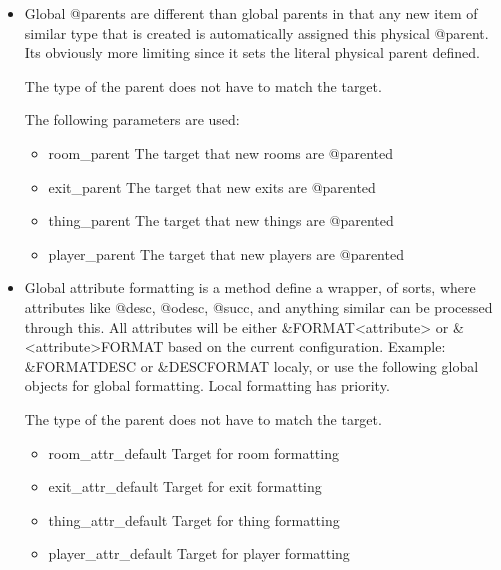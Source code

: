 \documentclass[letterpaper,10pt,english]{sphinxmanual}
\begin{document}
\begin{itemize}
\item {} 
\sphinxAtStartPar
Global @parents are different than global parents in that any new
item of similar type that is created is automatically assigned this
physical @parent.  It\textquotesingle{}s obviously more limiting since it sets
the literal physical parent defined.

\sphinxAtStartPar
The type of the parent does not have to match the target.

\sphinxAtStartPar
The following parameters are used:
\begin{itemize}
\item {} 
\sphinxAtStartPar
room\_parent           \sphinxhyphen{} The target that new rooms are @parented

\item {} 
\sphinxAtStartPar
exit\_parent           \sphinxhyphen{} The target that new exits are @parented

\item {} 
\sphinxAtStartPar
thing\_parent          \sphinxhyphen{} The target that new things are @parented

\item {} 
\sphinxAtStartPar
player\_parent         \sphinxhyphen{} The target that new players are @parented

\end{itemize}

\item {} 
\sphinxAtStartPar
Global attribute formatting is a method define a wrapper, of sorts,
where attributes like @desc, @odesc, @succ, and anything similar
can be processed through this.  All attributes will be either
\&FORMAT\textless{}attribute\textgreater{} or \&\textless{}attribute\textgreater{}FORMAT based on the current
configuration.  Example: \&FORMATDESC or \&DESCFORMAT localy, or
use the following global objects for global formatting.  Local
formatting has priority.

\sphinxAtStartPar
The type of the parent does not have to match the target.
\begin{itemize}
\item {} 
\sphinxAtStartPar
room\_attr\_default     \sphinxhyphen{} Target for room formatting

\item {} 
\sphinxAtStartPar
exit\_attr\_default     \sphinxhyphen{} Target for exit formatting

\item {} 
\sphinxAtStartPar
thing\_attr\_default    \sphinxhyphen{} Target for thing formatting

\item {} 
\sphinxAtStartPar
player\_attr\_default   \sphinxhyphen{} Target for player formatting

\end{itemize}

\end{itemize}
\end{document}
